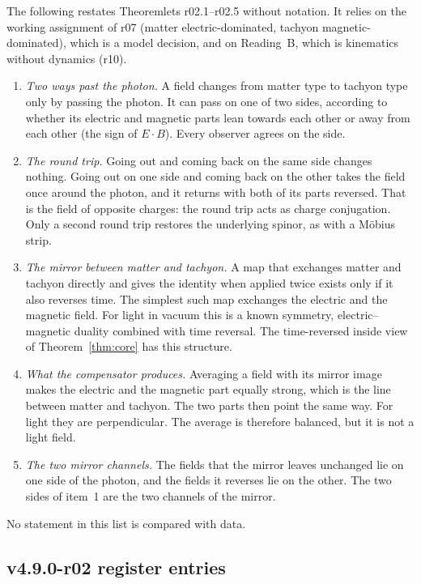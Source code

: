The following restates Theoremlets r02.1--r02.5 without notation.  It relies on the working assignment of r07
(matter electric-dominated, tachyon magnetic-dominated), which is a model decision, and on Reading~B, which is
kinematics without dynamics (r10).
\begin{enumerate}[leftmargin=2em]
\item \emph{Two ways past the photon.}  A field changes from matter type to tachyon type only by passing the photon.  It
can pass on one of two sides, according to whether its electric and magnetic parts lean towards each other or away from
each other (the sign of \(E\cdot B\)).  Every observer agrees on the side.
\item \emph{The round trip.}  Going out and coming back on the same side changes nothing.  Going out on one side and
coming back on the other takes the field once around the photon, and it returns with both of its parts reversed.  That
is the field of opposite charges: the round trip acts as charge conjugation.  Only a second round trip restores the
underlying spinor, as with a M\"obius strip.
\item \emph{The mirror between matter and tachyon.}  A map that exchanges matter and tachyon directly and gives the
identity when applied twice exists only if it also reverses time.  The simplest such map exchanges the electric and the
magnetic field.  For light in vacuum this is a known symmetry, electric--magnetic duality combined with time reversal.
The time-reversed inside view of Theorem~\ref{thm:core} has this structure.
\item \emph{What the compensator produces.}  Averaging a field with its mirror image makes the electric and the
magnetic part equally strong, which is the line between matter and tachyon.  The two parts then point the same way.
For light they are perpendicular.  The average is therefore balanced, but it is not a light field.
\item \emph{The two mirror channels.}  The fields that the mirror leaves unchanged lie on one side of the photon, and
the fields it reverses lie on the other.  The two sides of item~1 are the two channels of the mirror.
\end{enumerate}
No statement in this list is compared with data.

\subsection*{v4.9.0-r02 register entries}
\label{subsec:v490-r02-register}

